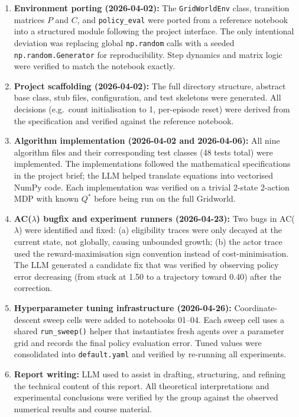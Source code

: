 \documentclass[11pt]{article}
\begin{document}
\begin{enumerate}[leftmargin=*]
    \item \textbf{Environment porting (2026-04-02):} The \texttt{GridWorldEnv}
        class, transition matrices $P$ and $C$, and \texttt{policy\_eval} were
        ported from a reference notebook into a structured module following the
        project interface.  The only intentional deviation was replacing global
        \texttt{np.random} calls with a seeded \texttt{np.random.Generator} for
        reproducibility.  Step dynamics and matrix logic were verified to match
        the notebook exactly.

    \item \textbf{Project scaffolding (2026-04-02):} The full directory structure,
        abstract base class, stub files, configuration, and test skeletons were
        generated.  All decisions (e.g.\ count initialisation to 1, per-episode
        reset) were derived from the specification and verified against the
        reference notebook.

    \item \textbf{Algorithm implementation (2026-04-02 and 2026-04-06):}
        All nine algorithm files and their corresponding test classes
        (48 tests total) were implemented.  The implementations followed
        the mathematical specifications in the project brief; the LLM helped
        translate equations into vectorised NumPy code.  Each implementation
        was verified on a trivial 2-state 2-action MDP with known $Q^*$ before
        being run on the full Gridworld.

    \item \textbf{AC($\lambda$) bugfix and experiment runners (2026-04-23):}
        Two bugs in AC($\lambda$) were identified and fixed: (a) eligibility
        traces were only decayed at the current state, not globally, causing
        unbounded growth; (b) the actor trace used the reward-maximisation sign
        convention instead of cost-minimisation.  The LLM generated a candidate
        fix that was verified by observing policy error decreasing (from stuck
        at 1.50 to a trajectory toward 0.40) after the correction.

    \item \textbf{Hyperparameter tuning infrastructure (2026-04-26):}
        Coordinate-descent sweep cells were added to notebooks 01--04.  Each
        sweep cell uses a shared \texttt{run\_sweep()} helper that instantiates
        fresh agents over a parameter grid and records the final policy evaluation
        error.  Tuned values were consolidated into \texttt{default.yaml} and
        verified by re-running all experiments.

    \item \textbf{Report writing:} LLM used to assist in drafting, structuring,
        and refining the technical content of this report.  All theoretical
        interpretations and experimental conclusions were verified by the group
        against the observed numerical results and course material.
\end{enumerate}
\end{document}
